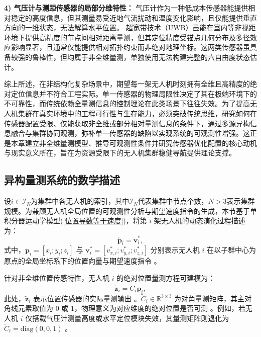 \textbf{4) 气压计与测距传感器的局部分维特性\cite{ZJXH201510001033,7346960}：}
气压计作为一种低成本传感器能提供相对稳定的高度信息，但其测量易受近地气流扰动和温度变化影响，且仅能提供垂直方向的一维状态，无法解算水平位置。
超宽带技术（UWB）虽能在室内等非视距环境下提供高精度的节点间相对距离量测，但其定位精度受锚点几何分布及多径效应影响显著，且通常仅能提供相对拓扑约束而非绝对地理坐标。这两类传感器虽具备较强的鲁棒性，但均属于非全维量测，单独使用无法构建完整的六自由度状态估计。

综上所述，在非结构化复杂场景中，期望每一架无人机时刻拥有全维且高精度的绝对定位信息并不符合工程实际。单一传感器的物理局限性决定了其在极端环境下的不可靠性，而传统依赖全量测信息的控制理论在此类场景下往往失效。为了提高无人机集群在真实环境中的工程可行性与生存能力，必须突破传统思维，研究如何在传感器配置受限、仅能获取非全维或部分相对量测信息的条件下，通过多源异构信息融合与集群协同观测，弥补单一传感器的缺陷以实现系统的可观测性增强。这正是本章建立非全维量测模型、推导可观测性条件并研究传感器优化配置的核心动机与现实意义所在，旨在为资源受限下的无人机集群稳健导航提供理论支撑。

\subsection{异构量测系统的数学描述}
设$ i \in \mathcal{I}_{N} $为集群中各无人机的索引，其中$\mathcal{I}_{N}$代表集群中节点个数，$N>3$表示集群规模。为兼顾无人机全局位置的可观测性分析与期望速度指令的生成，本节基于单积分器运动学模型(\ref{位置导数等于速度})，将第 $i$ 架无人机的动态演化过程描述为：
\begin{equation}
	\dot{\mathbf{p}}_i = \mathbf{v}_i^*,
	\label{一阶动力学}
\end{equation}
式中，$ {\mathbf{p}}_i = [x_i;y_i;z_i]$ 与 $\mathbf{v}_i^* = [{v}_{x,i}^* ; {v}_{y,i}^*; {v}_{z,i}^*] $ 分别表示无人机 $i$ 在以子群中心为原点的全局坐标系下的位置向量与期望速度指令 。

针对非全维位置传感特性，无人机 $i$ 的绝对位置量测方程可建模为：
\begin{equation}
	\tilde{\mathbf{z}}_i = \tilde{C}_i \mathbf{p}_i,
	\label{位置量测输出}
\end{equation}
此处，$\tilde{\mathbf{z}}_i$ 表示位置传感器的实际量测输出 。$\tilde{C}_i \in \mathbb{R}^{3 \times 3}$ 为对角量测矩阵，其主对角线元素取值为 $0$ 或 $1$，物理意义为对应维度的绝对位置是否可测 。例如，若无人机 $i$ 仅搭载气压计测量高度或水平定位模块失效，其量测矩阵则退化为 $\tilde{C}_i=\mathrm{diag}(0,0,1)$ 。

